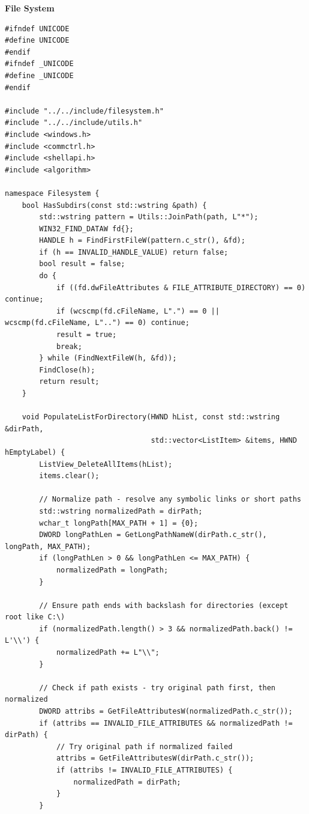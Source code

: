 \textbf{File System}
\begin{lstlisting}[style=CodeListing]
#ifndef UNICODE
#define UNICODE
#endif
#ifndef _UNICODE
#define _UNICODE
#endif

#include "../../include/filesystem.h"
#include "../../include/utils.h"
#include <windows.h>
#include <commctrl.h>
#include <shellapi.h>
#include <algorithm>

namespace Filesystem {
    bool HasSubdirs(const std::wstring &path) {
        std::wstring pattern = Utils::JoinPath(path, L"*");
        WIN32_FIND_DATAW fd{};
        HANDLE h = FindFirstFileW(pattern.c_str(), &fd);
        if (h == INVALID_HANDLE_VALUE) return false;
        bool result = false;
        do {
            if ((fd.dwFileAttributes & FILE_ATTRIBUTE_DIRECTORY) == 0) continue;
            if (wcscmp(fd.cFileName, L".") == 0 || wcscmp(fd.cFileName, L"..") == 0) continue;
            result = true;
            break;
        } while (FindNextFileW(h, &fd));
        FindClose(h);
        return result;
    }
    
    void PopulateListForDirectory(HWND hList, const std::wstring &dirPath, 
                                  std::vector<ListItem> &items, HWND hEmptyLabel) {
        ListView_DeleteAllItems(hList);
        items.clear();
        
        // Normalize path - resolve any symbolic links or short paths
        std::wstring normalizedPath = dirPath;
        wchar_t longPath[MAX_PATH + 1] = {0};
        DWORD longPathLen = GetLongPathNameW(dirPath.c_str(), longPath, MAX_PATH);
        if (longPathLen > 0 && longPathLen <= MAX_PATH) {
            normalizedPath = longPath;
        }
        
        // Ensure path ends with backslash for directories (except root like C:\)
        if (normalizedPath.length() > 3 && normalizedPath.back() != L'\\') {
            normalizedPath += L"\\";
        }
        
        // Check if path exists - try original path first, then normalized
        DWORD attribs = GetFileAttributesW(normalizedPath.c_str());
        if (attribs == INVALID_FILE_ATTRIBUTES && normalizedPath != dirPath) {
            // Try original path if normalized failed
            attribs = GetFileAttributesW(dirPath.c_str());
            if (attribs != INVALID_FILE_ATTRIBUTES) {
                normalizedPath = dirPath;
            }
        }
        

\end{lstlisting}
